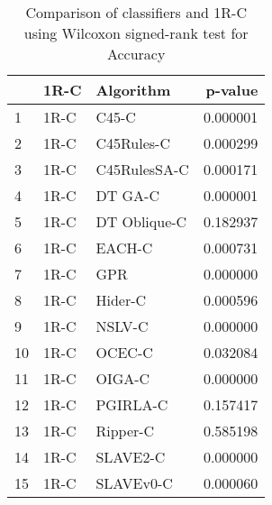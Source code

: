 \begin{table}
\footnotesize
\caption{Comparison of classifiers and 1R-C using Wilcoxon signed-rank test for Accuracy}
\label{tab:1R-C wilcoxon Accuracy comparison}
\begin{tabular}{lllr}
\hline
 & 1R-C & Algorithm & p-value \\
\hline
1 & 1R-C & C45-C & 0.000001 \\
2 & 1R-C & C45Rules-C & 0.000299 \\
3 & 1R-C & C45RulesSA-C & 0.000171 \\
4 & 1R-C & DT GA-C & 0.000001 \\
5 & 1R-C & DT Oblique-C & 0.182937 \\
6 & 1R-C & EACH-C & 0.000731 \\
7 & 1R-C & GPR & 0.000000 \\
8 & 1R-C & Hider-C & 0.000596 \\
9 & 1R-C & NSLV-C & 0.000000 \\
10 & 1R-C & OCEC-C & 0.032084 \\
11 & 1R-C & OIGA-C & 0.000000 \\
12 & 1R-C & PGIRLA-C & 0.157417 \\
13 & 1R-C & Ripper-C & 0.585198 \\
14 & 1R-C & SLAVE2-C & 0.000000 \\
15 & 1R-C & SLAVEv0-C & 0.000060 \\
\hline
\end{tabular}
\end{table}

